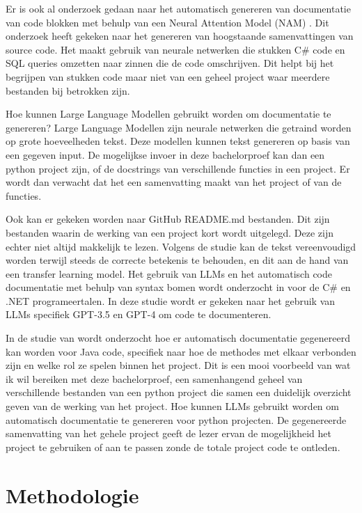 Er is ook al onderzoek gedaan naar het automatisch genereren van documentatie van code blokken met behulp van een Neural Attention Model (NAM) \autocite{IyerEtAl2016}.
Dit onderzoek heeft gekeken naar het genereren van hoogstaande samenvattingen van source code. 
Het maakt gebruik van neurale netwerken die stukken C\# code en SQL queries omzetten naar zinnen die de code omschrijven. 
Dit helpt bij het begrijpen van stukken code maar niet van een geheel project waar meerdere bestanden bij betrokken zijn.

Hoe kunnen Large Language Modellen gebruikt worden om documentatie te genereren?
Large Language Modellen zijn neurale netwerken die getraind worden op grote hoeveelheden tekst. 
Deze modellen kunnen tekst genereren op basis van een gegeven input. De mogelijkse invoer in deze bachelorproef kan dan een python project zijn, of de docstrings van verschillende functies in een project.
Er wordt dan verwacht dat het een samenvatting maakt van het project of van de functies.

Ook kan er gekeken worden naar GitHub README.md bestanden. Dit zijn bestanden waarin de werking van een project kort wordt uitgelegd. Deze zijn echter niet altijd makkelijk te lezen. 
Volgens de studie \textcite{GaoEtAl2023} kan de tekst vereenvoudigd worden terwijl steeds de correcte betekenis te behouden, en dit aan de hand van een transfer learning model.
Het gebruik van LLMs en het automatisch code documentatie met behulp van syntax bomen wordt onderzocht in \textcite{Procko2023} voor de C\# en .NET programeertalen.
In deze studie wordt er gekeken naar het gebruik van LLMs specifiek GPT-3.5 en GPT-4 om code te documenteren.

In de studie van \textcite{McBurneyMcMillan2014} wordt onderzocht hoe er automatisch documentatie gegenereerd kan worden voor Java code, specifiek naar hoe de methodes met elkaar verbonden zijn en welke rol ze spelen binnen het project.
Dit is een mooi voorbeeld van wat ik wil bereiken met deze bachelorproef, een samenhangend geheel van verschillende bestanden van een python project die samen een duidelijk overzicht geven van de werking van het project.
Hoe kunnen LLMs gebruikt worden om automatisch documentatie te genereren voor python projecten.
De gegenereerde samenvatting van het gehele project geeft de lezer ervan de mogelijkheid het project te gebruiken of aan te passen zonde de totale project code te ontleden.

\section{Methodologie}%
\label{sec:methodologie}

